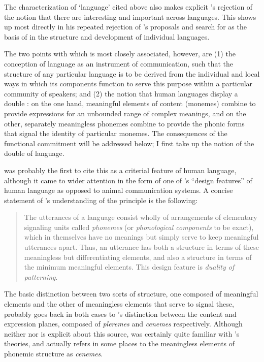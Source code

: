 The characterization of `language' cited above also makes explicit
{\Martinet}'s rejection of the notion that there are interesting and
important  across languages.  This shows up most directly in
his repeated rejection of {\Jakobson}'s proposals and search for
 as the basis of  in the structure and
development of individual languages.

The two points with which {\Martinet} is most closely associated,
however, are (1) the conception of language as an instrument of
communication, such that the structure of any particular language is
to be derived from the individual and local ways in which its
components function to serve this purpose within a particular 
community of speakers; and (2) the notion that
human languages display a double : on the one hand,
meaningful elements of content (monemes) combine to provide
expressions for an unbounded range of complex meanings, and on the
other, separately meaningless phonemes combine to provide the phonic
forms that signal the identity of particular monemes. The consequences
of the functional commitment will be addressed below; I first take up
the notion of the double  of language.

\citet{martinet49:double.articulation} was probably the first to
cite this as a criterial feature of human language, although it came to wider
attention in the form of one of {\Hockett}'s ``design features'' of human
language
\citep{hockett58:textbook,hockett:design_features,hockett.ascher64:human.revolution}
as opposed to animal communication systems. A concise statement of
{\Hockett}'s understanding of the principle is the following:

\begin{quotation}
  The utterances of a language consist wholly of arrangements of
  elementary signaling units called \emph{phonemes} (or
  \emph{phonological components} to be exact), which in themselves
  have no meanings but simply serve to keep meaningful utterances
  apart. Thus, an utterance has both a structure in terms of these
  meaningless but differentiating elements, and also a structure in
  terms of the minimum meaningful elements. This design feature is
  \emph{duality of patterning}.\\
  \citep[139]{hockett.ascher64:human.revolution}
\end{quotation}

The basic distinction between two sorts of structure, one composed of
meaningful elements and the other of meaningless elements that serve
to signal these, probably goes back in both cases to {\Hjelmslev}'s
distinction between the content and expression planes, composed of
\emph{pleremes} and \emph{cenemes} respectively. Although neither
{\Martinet} nor {\Hockett} is explicit about this source, {\Martinet} was
certainly quite familiar with {\Hjelmslev}'s theories, and {\Hockett}
actually refers in some places \citep[e.g.][574]{hockett58:textbook}
to the meaningless elements of phonemic structure as \emph{cenemes}.

